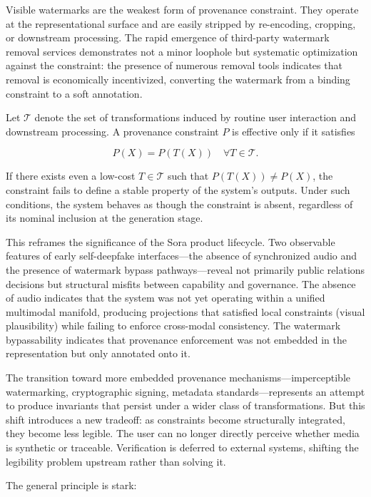 \documentclass[12pt, letterpaper]{article}
\theoremstyle{flyxion}
\begin{document}
Visible watermarks are the weakest form of provenance constraint. They operate at the representational surface and are easily stripped by re-encoding, cropping, or downstream processing. The rapid emergence of third-party watermark removal services demonstrates not a minor loophole but systematic optimization against the constraint: the presence of numerous removal tools indicates that removal is economically incentivized, converting the watermark from a binding constraint to a soft annotation.

Let $\mathcal{T}$ denote the set of transformations induced by routine user interaction and downstream processing. A provenance constraint $P$ is effective only if it satisfies

\begin{equation}
P(X) = P(T(X)) \quad \forall T \in \mathcal{T}.
\end{equation}

If there exists even a low-cost $T \in \mathcal{T}$ such that $P(T(X)) \neq P(X)$, the constraint fails to define a stable property of the system's outputs. Under such conditions, the system behaves as though the constraint is absent, regardless of its nominal inclusion at the generation stage.

This reframes the significance of the Sora product lifecycle. Two observable features of early self-deepfake interfaces---the absence of synchronized audio and the presence of watermark bypass pathways---reveal not primarily public relations decisions but structural misfits between capability and governance. The absence of audio indicates that the system was not yet operating within a unified multimodal manifold, producing projections that satisfied local constraints (visual plausibility) while failing to enforce cross-modal consistency. The watermark bypassability indicates that provenance enforcement was not embedded in the representation but only annotated onto it.

The transition toward more embedded provenance mechanisms---imperceptible watermarking, cryptographic signing, metadata standards---represents an attempt to produce invariants that persist under a wider class of transformations. But this shift introduces a new tradeoff: as constraints become structurally integrated, they become less legible. The user can no longer directly perceive whether media is synthetic or traceable. Verification is deferred to external systems, shifting the legibility problem upstream rather than solving it.

The general principle is stark:
\end{document}

